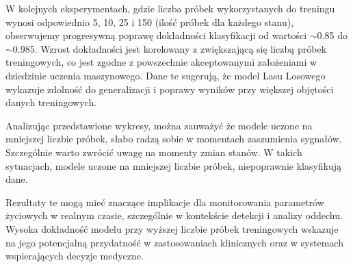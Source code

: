 \documentclass{article}
\begin{document}
W kolejnych eksperymentach, gdzie liczba próbek wykorzystanych do treningu wynosi odpowiednio 5, 10, 25 i 150 (ilość próbek dla każdego stanu), obserwujemy progresywną poprawę dokładności klasyfikacji od wartości $\sim$0.85 do $\sim$0.985. Wzrost dokładności jest korelowany z zwiększającą się liczbą próbek treningowych, co jest zgodne z powszechnie akceptowanymi założeniami w dziedzinie uczenia maszynowego. Dane te sugerują, że model Lasu Losowego wykazuje zdolność do generalizacji i poprawy wyników przy większej objętości danych treningowych.

Analizując przedstawione wykresy, można zauważyć że modele uczone na mniejszej liczbie próbek, słabo radzą sobie w momentach zaszumienia sygnałów. Szczególnie warto zwrócić uwagę na momenty zmian stanów. W takich sytuacjach, modele uczone na mniejszej liczbie próbek, niepoprawnie klasyfikują dane.

Rezultaty te mogą mieć znaczące implikacje dla monitorowania parametrów życiowych w realnym czasie, szczególnie w kontekście detekcji i analizy oddechu. Wysoka dokładność modelu przy wyższej liczbie próbek treningowych wskazuje na jego potencjalną przydatność w zastosowaniach klinicznych oraz w systemach wspierających decyzje medyczne.
\end{document}
